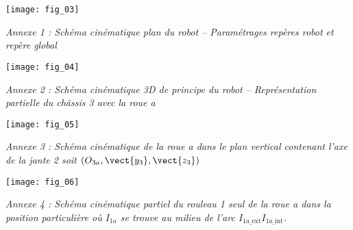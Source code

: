 \ifprof%
\begin{corrige}
\end{corrige}\else\fi



\begin{center}
\texttt{[image: fig\_03]}

\textit{Annexe 1 : Schéma cinématique plan du robot -- Paramétrages repères robot et repère global}
\end{center}
\begin{center}
\texttt{[image: fig\_04]}

\textit{Annexe 2 : Schéma cinématique 3D de principe du robot -- Représentation partielle du châssis 3 avec la roue a}
\end{center}
\begin{center}
\texttt{[image: fig\_05]}

\textit{Annexe 3 : Schéma cinématique de la roue a dans le plan vertical contenant l'axe de la jante 2 soit $\left( O_{3a},\vect{y_3},\vect{z_3}\right)$}
\end{center}
\begin{center}
\texttt{[image: fig\_06]}

\textit{Annexe 4 : Schéma cinématique partiel du rouleau 1 seul de la roue a dans la position particulière où $I_{1a}$ se trouve au milieu de l'arc $I_{1a\_\text{ext}}I_{1a\_\text{int}}$.}

\end{center}
